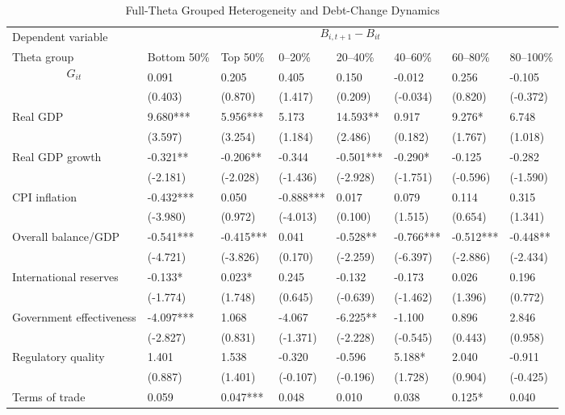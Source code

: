 \begin{table}[H]\centering
\begin{threeparttable}
\caption{Full-Theta Grouped Heterogeneity and Debt-Change Dynamics}
\label{tab:theta_group_heterogeneity_debt}
\scriptsize
\begin{tabularx}{\textwidth}{lYYYYYYY}
\toprule
Dependent variable &  \\
\cmidrule(lr){2-8}
Theta group & Bottom 50\% & Top 50\% & 0--20\% & 20--40\% & 40--60\% & 60--80\% & 80--100\% \\
\midrule
$$G_{it}$$ & 0.091 & 0.205 & 0.405 & 0.150 & -0.012 & 0.256 & -0.105 \\
  & (0.403) & (0.870) & (1.417) & (0.209) & (-0.034) & (0.820) & (-0.372) \\
Real GDP & 9.680*** & 5.956*** & 5.173 & 14.593** & 0.917 & 9.276* & 6.748 \\
  & (3.597) & (3.254) & (1.184) & (2.486) & (0.182) & (1.767) & (1.018) \\
Real GDP growth & -0.321** & -0.206** & -0.344 & -0.501*** & -0.290* & -0.125 & -0.282 \\
  & (-2.181) & (-2.028) & (-1.436) & (-2.928) & (-1.751) & (-0.596) & (-1.590) \\
CPI inflation & -0.432*** & 0.050 & -0.888*** & 0.017 & 0.079 & 0.114 & 0.315 \\
  & (-3.980) & (0.972) & (-4.013) & (0.100) & (1.515) & (0.654) & (1.341) \\
Overall balance/GDP & -0.541*** & -0.415*** & 0.041 & -0.528** & -0.766*** & -0.512*** & -0.448** \\
  & (-4.721) & (-3.826) & (0.170) & (-2.259) & (-6.397) & (-2.886) & (-2.434) \\
International reserves & -0.133* & 0.023* & 0.245 & -0.132 & -0.173 & 0.026 & 0.196 \\
  & (-1.774) & (1.748) & (0.645) & (-0.639) & (-1.462) & (1.396) & (0.772) \\
Government effectiveness & -4.097*** & 1.068 & -4.067 & -6.225** & -1.100 & 0.896 & 2.846 \\
  & (-2.827) & (0.831) & (-1.371) & (-2.228) & (-0.545) & (0.443) & (0.958) \\
Regulatory quality & 1.401 & 1.538 & -0.320 & -0.596 & 5.188* & 2.040 & -0.911 \\
  & (0.887) & (1.401) & (-0.107) & (-0.196) & (1.728) & (0.904) & (-0.425) \\
Terms of trade & 0.059 & 0.047*** & 0.048 & 0.010 & 0.038 & 0.125* & 0.040 \\

\end{tabularx}
\end{threeparttable}
\end{table}
